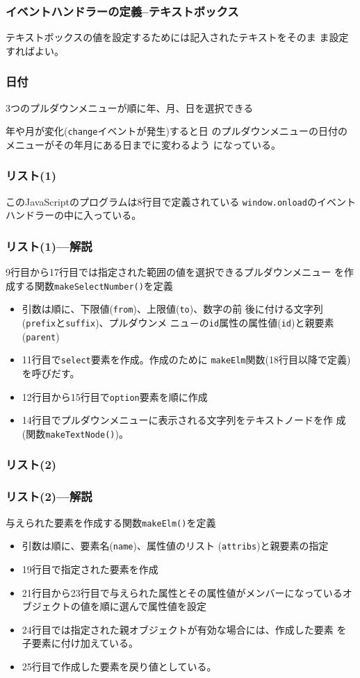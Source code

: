 \begin{frame}[containsverbatim]
 \frametitle{イベントハンドラーの定義--テキストボックス}
 テキストボックスの値を設定するためには記入されたテキストをそのま
       ま設定すればよい。
\end{frame}
\begin{frame}[containsverbatim]
\frametitle{日付}
3つのプルダウンメニューが順に年、月、日を選択できる

年や月が変化(\texttt{change}イベントが発生)すると日
 のプルダウンメニューの日付のメニューがその年月にある日までに変わるよう
 になっている。
\end{frame}
\begin{frame}[containsverbatim]
\frametitle{リスト(1)}
 このJavaScriptのプログラムは8行目で定義されている
       \texttt{window.onload}のイベントハンドラーの中に入っている。

\end{frame}
\begin{frame}[containsverbatim]
\frametitle{リスト(1)---解説}
 9行目から17行目では指定された範囲の値を選択できるプルダウンメニュー
       を作成する関数\texttt{makeSelectNumber()}を定義
\begin{itemize}
 \item 引数は順に、下限値(\texttt{from})、上限値(\texttt{to})、数字の前
       後に付ける文字列(\texttt{prefix}と\texttt{suffix})、プルダウンメ
       ニュ－の\texttt{id}属性の属性値(\texttt{id})と親要素
       (\texttt{parent})
 \item 11行目で\texttt{select}要素を作成。作成のために
       \texttt{makeElm}関数(18行目以降で定義)を呼びだす。
 \item 12行目から15行目で\texttt{option}要素を順に作成
 \item 14行目でプルダウンメニューに表示される文字列をテキストノードを作
       成(関数\texttt{makeTextNode()})。
\end{itemize}
\end{frame}
\begin{frame}[containsverbatim]
\frametitle{リスト(2)}
\end{frame}
\begin{frame}[containsverbatim]
\frametitle{リスト(2)---解説}
与えられた要素を作成する関数\texttt{makeElm()}を定義
\begin{itemize}
 \item 引数は順に、要素名(\texttt{name})、属性値のリスト
       (\texttt{attribs})と親要素の指定
 \item 19行目で指定された要素を作成
 \item 21行目から23行目で与えられた属性とその属性値がメンバーになっているオ
       ブジェクトの値を順に選んで属性値を設定
 \item 24行目では指定された親オブジェクトが有効な場合には、作成した要素
       を子要素に付け加えている。
 \item 25行目で作成した要素を戻り値としている。
\end{itemize}
\end{frame}
